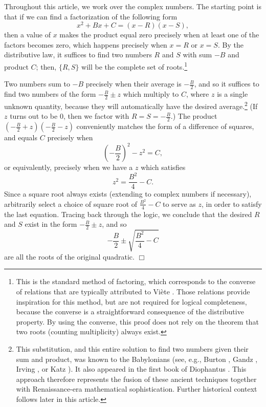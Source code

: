 \documentclass[11pt]{article}
\begin{document}
Throughout this article, we work over the complex numbers. The starting point is
that if we can find a factorization of the following form
\begin{equation}
  \label{eq:monic}
  x^2 + Bx + C = (x-R)(x-S),
\end{equation}
then a value of $x$ makes the product equal zero precisely when at least one of
the factors becomes zero, which happens precisely when $x = R$ or $x = S$. By
the distributive law, it suffices to find two numbers $R$ and $S$ with sum $-B$
and product $C$; then, $\{R, S\}$ will be the complete set of
roots.\footnote{This is the standard method of factoring, which corresponds to
  the converse of relations that are typically attributed to Vi\`ete
  \cite{viete}. Those relations provide inspiration for this method, but are not
  required for logical completeness, because the converse is a straightforward
  consequence of the distributive property. By using the converse, this proof
  does not rely on the theorem that two roots (counting multiplicity) always
exist.}

Two numbers sum to $-B$ precisely when their average is $-\frac{B}{2}$, and so
it suffices to find two numbers of the form $-\frac{B}{2} \pm z$ which multiply
to $C$, where $z$ is a single unknown quantity, because they will automatically
have the desired average.\footnote{This substitution, and this entire solution
  to find two numbers given their sum and product, was known to the Babylonians
  (see, e.g., Burton \cite{burton}, Gandz \cite{gandz-1937}, Irving
  \cite{irving}, or Katz \cite{katz}). It also appeared in the first book of
  Diophantus \cite{diophantus}. This approach therefore represents the fusion of
  these ancient techniques together with Renaissance-era mathematical
  sophistication.  Further historical context follows later in this article.}
(If $z$ turns out to be 0, then we factor with $R = S = -\frac{B}{2}$.) The
product $(-\frac{B}{2} + z)(-\frac{B}{2} - z)$ conveniently matches the form
of a difference of squares, and equals $C$ precisely when
\begin{displaymath}
  \left( -\frac{B}{2} \right)^2 - z^2 = C,
\end{displaymath}
or equivalently, precisely when we have a $z$ which satisfies
\begin{displaymath}
  z^2 = \frac{B^2}{4} - C.
\end{displaymath}
Since a square root always exists (extending to complex numbers if necessary),
arbitrarily select a choice of square root of $\frac{B^2}{4} - C$ to serve as
$z$, in order to satisfy the last equation. Tracing back through the logic, we
conclude that the desired $R$ and $S$ exist in the form $-\frac{B}{2} \pm z$,
and so
\begin{equation}
  \label{eq:formula-monic}
  -\frac{B}{2} \pm \sqrt{\frac{B^2}{4} - C}
\end{equation}
are all the roots of the original quadratic.
\hfill $\Box$
\end{document}
